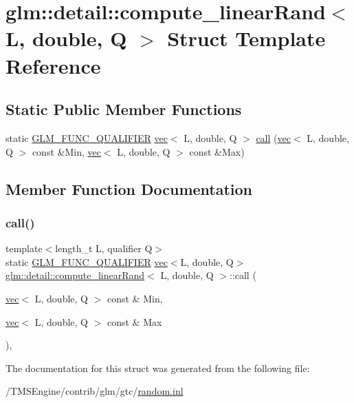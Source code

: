 \hypertarget{structglm_1_1detail_1_1compute__linear_rand_3_01_l_00_01double_00_01_q_01_4}{}\section{glm\+:\+:detail\+:\+:compute\+\_\+linear\+Rand$<$ L, double, Q $>$ Struct Template Reference}
\label{structglm_1_1detail_1_1compute__linear_rand_3_01_l_00_01double_00_01_q_01_4}
\subsection*{Static Public Member Functions}
\begin{DoxyCompactItemize}
\item 
static \hyperlink{setup_8hpp_a33fdea6f91c5f834105f7415e2a64407}{G\+L\+M\+\_\+\+F\+U\+N\+C\+\_\+\+Q\+U\+A\+L\+I\+F\+I\+ER} \hyperlink{structglm_1_1vec}{vec}$<$ L, double, Q $>$ \hyperlink{structglm_1_1detail_1_1compute__linear_rand_3_01_l_00_01double_00_01_q_01_4_a3b4cda7d26488d79f0b78ef4d7ac728e}{call} (\hyperlink{structglm_1_1vec}{vec}$<$ L, double, Q $>$ const \&Min, \hyperlink{structglm_1_1vec}{vec}$<$ L, double, Q $>$ const \&Max)
\end{DoxyCompactItemize}


\subsection{Member Function Documentation}
\mbox{\label{structglm_1_1detail_1_1compute__linear_rand_3_01_l_00_01double_00_01_q_01_4_a3b4cda7d26488d79f0b78ef4d7ac728e}} 
\subsubsection{\texorpdfstring{call()}{call()}}
{\footnotesize\ttfamily template$<$length\+\_\+t L, qualifier Q$>$ \\
static \hyperlink{setup_8hpp_a33fdea6f91c5f834105f7415e2a64407}{G\+L\+M\+\_\+\+F\+U\+N\+C\+\_\+\+Q\+U\+A\+L\+I\+F\+I\+ER} \hyperlink{structglm_1_1vec}{vec}$<$L, double, Q$>$ \hyperlink{structglm_1_1detail_1_1compute__linear_rand}{glm\+::detail\+::compute\+\_\+linear\+Rand}$<$ L, double, Q $>$\+::call (\begin{DoxyParamCaption}\item[{\hyperlink{structglm_1_1vec}{vec}$<$ L, double, Q $>$ const \&}]{Min,  }\item[{\hyperlink{structglm_1_1vec}{vec}$<$ L, double, Q $>$ const \&}]{Max }\end{DoxyParamCaption})\hspace{0.3cm}{\ttfamily [inline]}, {\ttfamily [static]}}



The documentation for this struct was generated from the following file\+:\begin{DoxyCompactItemize}
\item 
/\+T\+M\+S\+Engine/contrib/glm/gtc/\hyperlink{random_8inl}{random.\+inl}\end{DoxyCompactItemize}

